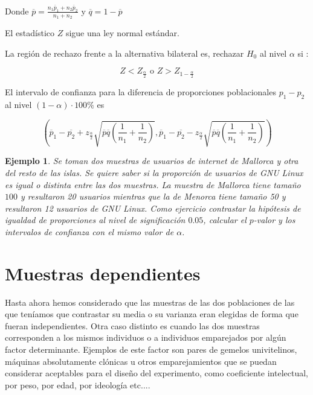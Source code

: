 \documentclass[12pt]{report}
\newtheorem{example}[definition]{Ejemplo}
\begin{document}
Donde $\overline{p}=\frac{n_1 \overline{p}_1 +n_2 \overline{p}_2}{n_1 +n_2}$ y $\overline{q}=1-\overline{p}$


El estadístico $Z$ sigue una ley normal estándar.

La región de rechazo frente a la alternativa bilateral es, rechazar $H_0$ al nivel $\alpha$ si :

$$Z< Z_{\frac{\alpha}{2}}\mbox{ o } Z> Z_{1-\frac{\alpha}{2}}$$


El intervalo de confianza para la diferencia de proporciones poblacionales $p_1-p_2$
al nivel $(1-\alpha)\cdot 100\%$ es



$$ \left(\overline{p}_1-\overline{p_2}+z_{\frac{\alpha}{2}}\sqrt{\overline{p}
 \overline{q}\left(\frac{1}{n_1}+\frac{1}{n_2}\right)},
 \overline{p}_1-\overline{p_2}-z_{\frac{\alpha}{2}}\sqrt{\overline{p}
 \overline{q}\left(\frac{1}{n_1}+\frac{1}{n_2}\right)}\right)
$$

\begin{example}

Se toman dos muestras de usuarios de internet de Mallorca y otra del resto de las islas. Se quiere saber si la proporción de usuarios de GNU Linux es igual o distinta entre las dos muestras. La muestra de Mallorca tiene tamaño $100$ y resultaron 20 usuarios mientras que la de Menorca tiene tamaño 50  y resultaron 12 usuarios de GNU Linux. 
Como ejercicio contrastar la hipótesis de igualdad de proporciones al nivel de significación $0.05$, calcular el $p$-valor y los intervalos de confianza con el mismo  valor de $\alpha$. 


\end{example}


\section{Muestras dependientes}


Hasta ahora hemos considerado que las muestras de las dos poblaciones de las que teníamos que contrastar su media o su varianza eran elegidas de forma que fueran independientes. Otra caso distinto es cuando las dos muestras corresponden a los mismos individuos o a individuos emparejados por algún factor  determinante. Ejemplos de este factor  son pares de gemelos univitelinos, máquinas absolutamente clónicas u otros emparejamientos que se puedan considerar aceptables para el diseño del experimento, como coeficiente intelectual, por peso, por edad, por ideología etc....
\end{document}
